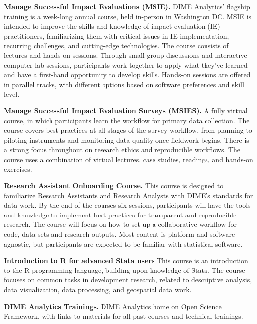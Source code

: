 \textbf{Manage Successful Impact Evaluations (MSIE).}
DIME Analytics’ flagship training is a week-long annual course, held in-person in Washington DC. MSIE is intended to improve the skills and knowledge of impact evaluation (IE) practitioners, familiarizing them with critical issues in IE implementation, recurring challenges, and cutting-edge technologies. The course consists of lectures and hands-on sessions. Through small group discussions and interactive computer lab sessions, participants work together to apply what they’ve learned and have a first-hand opportunity to develop skills. Hands-on sessions are offered in parallel tracks, with different options based on software preferences and skill level.

\textbf{Manage Successful Impact Evaluation Surveys (MSIES).}
A fully virtual course, in which participants learn the workflow for primary data collection. The course covers best practices at all stages of the survey workflow, from planning to piloting instruments and monitoring data quality once fieldwork begins. There is a strong focus throughout on research ethics and reproducible workflows. The course uses a combination of virtual lectures, case studies, readings, and hands-on exercises.

\textbf{Research Assistant Onboarding Course.}
This course is designed to familiarize Research Assistants and Research Analysts with DIME’s standards for data work. By the end of the courses six sessions, participants will have the tools and knowledge to implement best practices for transparent and reproducible research. The course will focus on how to set up a collaborative workflow for code, data sets and research outputs. Most content is platform and software agnostic, but participants are expected to be familiar with statistical software.

\textbf{Introduction to R for advanced Stata users}
This course is an introduction to the R programming language, building upon knowledge of Stata. The course focuses on common tasks in development research, related to descriptive analysis, data visualization, data processing, and geospatial data work. 

\textbf{DIME Analytics Trainings.}
DIME Analytics home on Open Science Framework, with links to materials for all past courses and technical trainings. 


